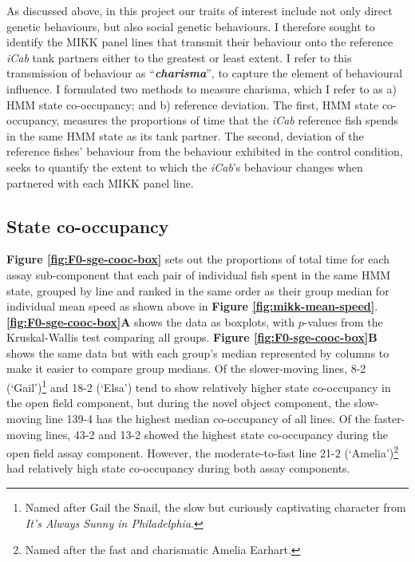 \documentclass[
]{book}
\begin{document}
As discussed above, in this project our traits of interest include not only direct genetic behaviours, but also social genetic behaviours. I therefore sought to identify the MIKK panel lines that transmit their behaviour onto the reference \emph{\textcolor{iCab_424B4D}{iCab}} tank partners either to the greatest or least extent. I refer to this transmission of behaviour as ``\textbf{\emph{charisma}}'', to capture the element of behavioural influence. I formulated two methods to measure charisma, which I refer to as a) HMM state co-occupancy; and b) reference deviation. The first, HMM state co-occupancy, measures the proportions of time that the \emph{\textcolor{iCab_424B4D}{iCab}} reference fish spends in the same HMM state as its tank partner. The second, deviation of the reference fishes' behaviour from the behaviour exhibited in the control condition, seeks to quantify the extent to which the \emph{\textcolor{iCab_424B4D}{iCab}}'s behaviour changes when partnered with each MIKK panel line.

\hypertarget{state-co-occupancy}{%
\subsection{State co-occupancy}\label{state-co-occupancy}}

\textbf{Figure \ref{fig:F0-sge-cooc-box}} sets out the proportions of total time for each assay sub-component that each pair of individual fish spent in the same HMM state, grouped by line and ranked in the same order as their group median for individual mean speed as shown above in \textbf{Figure \ref{fig:mikk-mean-speed}}. \textbf{\ref{fig:F0-sge-cooc-box}A} shows the data as boxplots, with \(p\)-values from the Kruskal-Wallis test comparing all groups. \textbf{Figure \ref{fig:F0-sge-cooc-box}B} shows the same data but with each group's median represented by columns to make it easier to compare group medians. Of the slower-moving lines, \textcolor{8-2 (‘Gail’)_FF699C}{8-2 (‘Gail’)}\footnote{Named after Gail the Snail, the slow but curiously captivating character from \emph{It's Always Sunny in Philadelphia}.} and \textcolor{18-2 (‘Elsa’)_FF66A6}{18-2 (‘Elsa’)} tend to show relatively higher state co-occupancy in the open field component, but during the novel object component, the slow-moving line \textcolor{139-4_FF61CC}{139-4} has the highest median co-occupancy of all lines. Of the faster-moving lines, \textcolor{43-2_F17D50}{43-2} and \textcolor{13-2_F57A5F}{13-2} showed the highest state co-occupancy during the open field assay component. However, the moderate-to-fast line \textcolor{21-2 (‘Amelia’)_49B500}{21-2 (‘Amelia’)}\footnote{Named after the fast and charismatic Amelia Earhart.} had relatively high state co-occupancy during both assay components.
\end{document}
